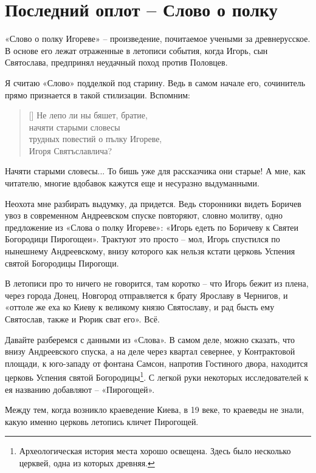 \chapter{Последний оплот – Слово о полку}

«Слово о полку Игореве» – произведение, почитаемое учеными за древнерусское. В основе его лежат отраженные в летописи события, когда Игорь, сын Святослава, предпринял неудачный поход против Половцев.

Я считаю «Слово» подделкой под старину. Ведь в самом начале его, сочинитель прямо признается в такой стилизации. Вспомним:

\settowidth{\versewidth}{трудных повестий о пълку Игореве,} 
\begin{verse}[\versewidth]
Не лепо ли ны бяшет, братие,\\
начяти старыми словесы\\
трудных повестий о пълку Игореве,\\
Игоря Святъславлича?
\end{verse}

Начяти старыми словесы... То бишь уже для рассказчика они старые! А мне, как читателю, многие вдобавок кажутся еще и несуразно выдуманными.

Неохота мне разбирать выдумку, да придется. Ведь сторонники видеть Боричев увоз в современном Андреевском спуске повторяют, словно молитву, одно предложение из «Слова о полку Игореве»: «Игорь едеть по Боричеву к Святеи Богородици Пирогощеи». Трактуют это просто – мол, Игорь спустился по нынешнему Андреевскому, внизу которого как нельзя кстати церковь Успения святой Богородицы Пирогощи.

В летописи про то ничего не говорится, там коротко – что Игорь бежит из плена, через города Донец,  Новгород отправляется к брату Ярославу в Чернигов, и «оттоле же еха ко Киеву к великому князю Святославу, и рад бысть ему Святослав, также и Рюрик сват его». Всё.

Давайте разберемся с данными из «Слова». В самом деле, можно сказать, что внизу Андреевского спуска, а на деле через квартал севернее, у Контрактовой площади, к юго-западу от фонтана Самсон, напротив Гостиного двора, находится церковь Успения святой Богородицы\footnote{Археологическая история места хорошо освещена. Здесь было несколько церквей, одна из которых древняя.}. С легкой руки некоторых исследователей к ея названию добавляют – «Пирогощей».

Между тем, когда возникло краеведение Киева, в 19 веке, то краеведы не знали, какую именно церковь летопись кличет Пирогощей.


